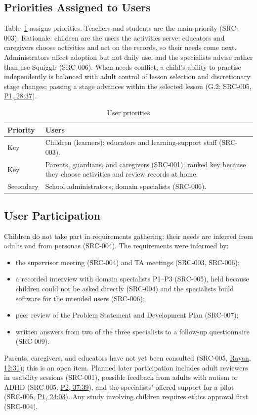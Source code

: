 \documentclass[12pt]{article}
\renewcommand{\_}{\textunderscore\allowbreak}%
\newcommand{\intlink}[3]{\hyperref[int:#1-#2]{#3}}
\newcommand{\intref}[2]{\intlink{#1}{#2}{#1, #2}}
\begin{document}
\subsection{Priorities Assigned to Users}

Table~\ref{tab:userPriorities} assigns priorities. Teachers and students are the
main priority (SRC-003). Rationale: children are the users the activities serve;
educators and caregivers choose activities and act on the records, so their
needs come next. Administrators affect adoption but not daily use, and the
specialists advise rather than use Squigglr (SRC-006). When needs conflict, a
child's ability to practise independently is balanced with adult control of
lesson selection and discretionary stage changes; passing a stage advances
within the selected lesson (G.2; SRC-005, \intref{P1}{28:37}).

\begin{table}[H]
\centering
\caption{User priorities}
\label{tab:userPriorities}
\begin{tabularx}{\textwidth}{lX}
\toprule
\textbf{Priority} & \textbf{Users} \\
\midrule
Key & Children (learners); educators and learning-support staff (SRC-003). \\
Key & Parents, guardians, and caregivers (SRC-001); ranked key because they
choose activities and review records at home. \\
Secondary & School administrators; domain specialists (SRC-006). \\
\bottomrule
\end{tabularx}
\end{table}

\subsection{User Participation}

Children do not take part in requirements gathering; their needs are inferred
from adults and from personas (SRC-004). The requirements were informed by:
\begin{itemize}
  \item the supervisor meeting (SRC-004) and TA meetings (SRC-003, SRC-006);
  \item a recorded interview with domain specialists P1--P3 (SRC-005), held
  because children could not be asked directly (SRC-004) and the specialists
  build software for the intended users (SRC-006);
  \item peer review of the Problem Statement and Development Plan (SRC-007);
  \item written answers from two of the three specialists to a follow-up
  questionnaire (SRC-009).
\end{itemize}
Parents, caregivers, and educators have not yet been consulted (SRC-005,
\intref{Rayan}{12:31}); this is an open item. Planned later participation
includes adult reviewers in usability sessions (SRC-001), possible feedback from
adults with autism or ADHD (SRC-005, \intref{P2}{37:39}), and the specialists'
offered support for a pilot (SRC-005, \intref{P1}{24:03}). Any study involving
children requires ethics approval first (SRC-004).
\end{document}
